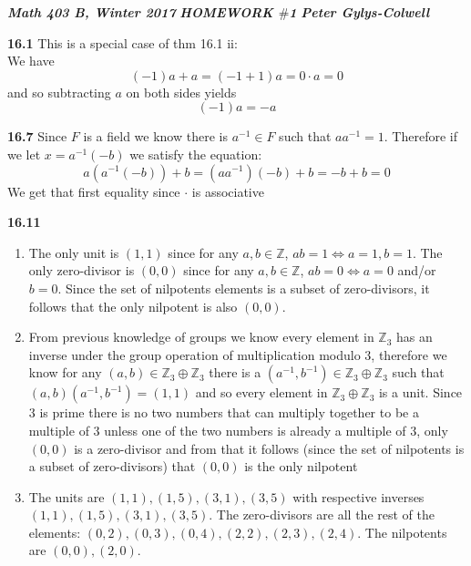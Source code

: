 \documentclass[12pt]{article}
\newenvironment{ques}{\vspace{2 ex}}{\vspace{2 ex}}
\theoremstyle{definition}
\begin{document}
\noindent \textit{\textbf{Math 403 B, Winter 2017}} \hspace{1.3cm}
\textit{\textbf{HOMEWORK $\#$1}} \hspace{1.3cm} \textit{\textbf{Peter
Gylys-Colwell}} 

\vspace{1cm}

\begin{ques}
	\textbf{16.1}
	This is a special case of thm 16.1 ii:\\
	We have 
	$$(-1)a + a = (-1 + 1)a = 0 \cdot a = 0$$
	and so subtracting $a$ on both sides yields 
	$$(-1)a = -a$$
\end{ques}

\begin{ques}
	\textbf{16.7}
	Since $F$ is a field we know there is $a^{-1} \in F$ such that
	$aa^{-1} = 1$. Therefore if we let $x = a^{-1}(-b)$ we satisfy the equation:
	$$a(a^{-1}(-b)) + b = (aa^{-1})(-b) + b = -b + b = 0$$
	We get that first equality since $\cdot$ is associative
\end{ques}

\begin{ques}
	\textbf{16.11}
	\begin{enumerate}
		\item
			The only unit is $(1,1)$ since for any $a,b \in
			\mathbb Z$, $ab = 1 \Leftrightarrow a=1, b=1$.
			The only zero-divisor is $(0,0)$ since for any
			$a,b \in \mathbb Z$, $ab = 0 \Leftrightarrow
			a=0$ and/or $b = 0$. Since the set of nilpotents
			elements is a subset of zero-divisors, it
			follows that the only nilpotent is also $(0,0)$.
		\item
			From previous knowledge of groups we know every
			element in $\mathbb Z_3$ has an inverse under
			the group operation of multiplication modulo
			$3$, therefore we know for any $(a,b) \in
			\mathbb Z_3 \oplus \mathbb Z_3$ there is a
			$(a^{-1}, b^{-1}) \in \mathbb Z_3 \oplus
			\mathbb Z_3$ such that $(a,b)(a^{-1},b^{-1}) =
			(1,1)$ and so every element in $\mathbb Z_3
			\oplus \mathbb Z_3$ is a unit. Since $3$ is
			prime there is no two numbers that can multiply
			together to be a multiple of $3$ unless one of
			the two numbers is already a multiple of $3$,
			only $(0,0)$ is a zero-divisor and
			from that it follows (since the set of
			nilpotents is a subset of zero-divisors) that
			$(0,0)$ is the only nilpotent
		\item
			The units are $(1,1), (1,5), (3,1), (3,5)$ with
			respective inverses $(1,1), (1,5), (3,1),
			(3,5)$. The zero-divisors are all the rest of
			the elements: $(0,2), (0,3), (0,4), (2,2),
			(2,3), (2,4)$. The nilpotents are $(0,0),
			(2,0)$.
	\end{enumerate}
\end{ques}
\end{document}

